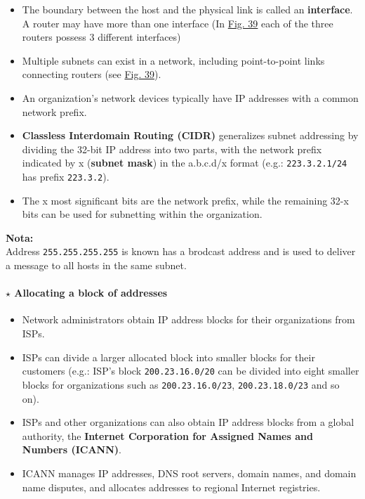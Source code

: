 \begin{itemize}[noitemsep, nolistsep]
    \item The boundary between the host and the physical link is called an \textbf{interface}. A router may have more than one interface (In \hyperref[fig:Subnet]{Fig. 39} each of the three routers possess 3 different interfaces)
    
    \item Multiple subnets can exist in a network, including point-to-point links connecting routers (see \hyperref[fig:Subnet]{Fig. 39}).
    
    \item An organization's network devices typically have IP addresses with a common network prefix.
    
    \item \textbf{Classless Interdomain Routing (CIDR)} generalizes subnet addressing by dividing the 32-bit IP address into two parts, with the network prefix indicated by x (\textbf{subnet mask}) in the a.b.c.d/x format (e.g.: \texttt{223.3.2.1/24} has prefix \texttt{223.3.2}).

    \item The x most significant bits are the network prefix, while the remaining 32-x bits can be used for subnetting within the organization.
\end{itemize}

\vspace{1 em}
\noindent\textbf{Nota:}\\
Address \texttt{255.255.255.255} is known has a brodcast address and is used to deliver a message to all hosts in the same subnet.

\paragraph[4.4.2.2 Allocating a block of addresses ]{$\pmb{\star}$ Allocating a block of addresses}\mbox{}
\begin{itemize}
    \item Network administrators obtain IP address blocks for their organizations from ISPs.
    
    \item ISPs can divide a larger allocated block into smaller blocks for their customers (e.g.: ISP's block \texttt{200.23.16.0/20} can be divided into eight smaller blocks for organizations such as \texttt{200.23.16.0/23}, \texttt{200.23.18.0/23} and so on).
    
    \item ISPs and other organizations can also obtain IP address blocks from a global authority, the \textbf{Internet Corporation for Assigned Names and Numbers (ICANN)}.
    
    \item ICANN manages IP addresses, DNS root servers, domain names, and domain name disputes, and allocates addresses to regional Internet registries.
\end{itemize}

